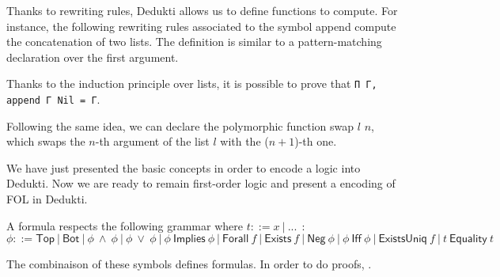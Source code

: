 \documentclass{article}
\begin{document}
	
	
	
	Thanks to rewriting rules, Dedukti allows us to define functions to compute.
	For instance, the following rewriting rules associated to the symbol \textsf{append} compute the concatenation of two lists.
	The definition is similar to a pattern-matching declaration over the first argument.
	
	
	
	\noindent Thanks to the induction principle over lists, it is possible to prove that \lstinline[language=Dialekto, firstnumber=last]|Π Γ, append Γ Nil = Γ|.
	
	
	
	
	\noindent Following the same idea, we can declare the polymorphic function \textsf{swap} $l$ $n$, which swaps the $n$-th argument of the list $l$ with the ($n+1$)-th one.
	
	
	
	
	We have just presented the basic concepts in order to encode a logic into Dedukti. Now we are ready to remain first-order logic and present a encoding of FOL in Dedukti.
	
\newpage

	A formula respects the following grammar where $t ::= x~|~...~~$: \\
	$\phi ::= \textsf{Top}~|~\textsf{Bot}~|~\phi~\land~\phi~|~\phi~\lor~\phi~|~\phi~\textsf{Implies}~\phi~|~\textsf{Forall}~f~|~\textsf{Exists}~f~|~\textsf{Neg}~\phi~|~\phi~\textsf{Iff}~\phi~|~\textsf{ExistsUniq}~f~|~t~\textsf{Equality}~t$
	
	
	
	
	
	The combinaison of these symbols defines formulas.
	In order to do proofs, .
	
\end{document}
